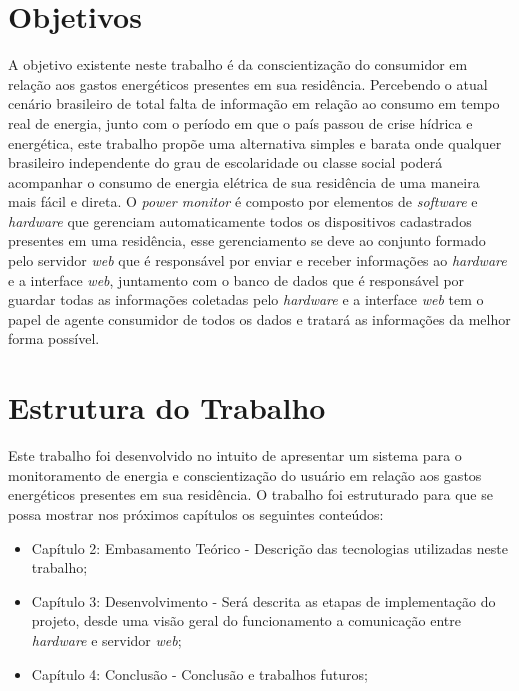 \section{Objetivos}
A objetivo existente neste trabalho é da conscientização do consumidor em relação aos gastos energéticos presentes em sua residência. Percebendo o
atual cenário brasileiro de total falta de informação em relação ao consumo em tempo real de energia, junto com o período em que o país 
passou de crise hídrica e energética, este trabalho propõe uma alternativa simples e barata onde qualquer brasileiro independente do grau de 
escolaridade ou classe social poderá acompanhar o consumo de energia elétrica de sua residência de uma maneira mais fácil e direta. O \textit{power monitor}
é composto por elementos de \textit{software} e \textit{hardware} que gerenciam automaticamente todos os dispositivos cadastrados presentes em uma
residência, esse gerenciamento se deve ao conjunto formado pelo servidor \textit{web} que é responsável por enviar e receber informações ao \textit{hardware} e
a interface \textit{web}, juntamento com o banco de dados que é responsável por guardar todas as informações coletadas pelo \textit{hardware} e a interface
\textit{web} tem o papel de agente consumidor de todos os dados e tratará as informações da melhor forma possível.


\section{Estrutura do Trabalho}
Este trabalho foi desenvolvido no intuito de apresentar um sistema para o monitoramento de energia e conscientização do usuário em relação aos 
gastos energéticos presentes em sua residência. O trabalho foi estruturado para que se possa mostrar nos próximos capítulos os seguintes conteúdos:
\begin{itemize}
	\item Capítulo 2: Embasamento Teórico - Descrição das tecnologias utilizadas neste trabalho;
	\item Capítulo 3: Desenvolvimento - Será descrita as etapas de implementação do projeto, desde uma visão geral do funcionamento a comunicação entre \textit{hardware} e servidor \textit{web};
	\item Capítulo 4: Conclusão - Conclusão e trabalhos futuros;
\end{itemize}